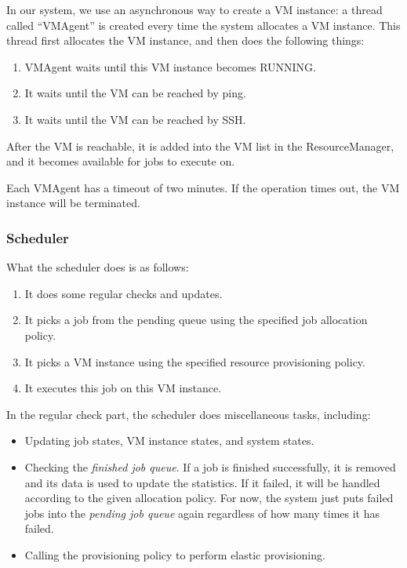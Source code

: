 In our system, we use an asynchronous way to create a VM instance: a thread called ``VMAgent'' is created every time the system allocates a VM instance. This thread first allocates the VM instance, and then does the following things:

\begin{enumerate}
\item VMAgent waits until this VM instance becomes RUNNING.
\item It waits until the VM can be reached by ping.
\item It waits until the VM can be reached by SSH.
\end{enumerate}

After the VM is reachable, it is added into the VM list in the ResourceManager, and it becomes available for jobs to execute on.

Each VMAgent has a timeout of two minutes. If the operation times out, the VM instance will be terminated.

\subsubsection{Scheduler}
What the scheduler does is as follows:

\begin{enumerate}
\item It does some regular checks and updates.
\item It picks a job from the pending queue using the specified job allocation policy.
\item It picks a VM instance using the specified resource provisioning policy.
\item It executes this job on this VM instance.
\end{enumerate}

In the regular check part, the scheduler does miscellaneous tasks, including:
\begin{itemize}
\item Updating job states, VM instance states, and system states.
\item Checking the \emph{finished job queue}. If a job is finished successfully, it is removed and its data is used to update the statistics. If it failed, it will be handled according to the given allocation policy. For now, the system just puts failed jobs into the \emph{pending job queue} again regardless of how many times it has failed.
\item Calling the provisioning policy to perform elastic provisioning.
\end{itemize}

